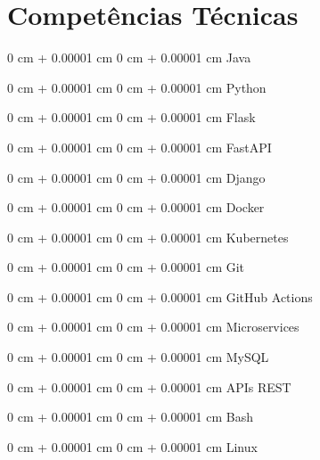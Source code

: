 \documentclass[10pt, letterpaper]{article}
\newenvironment{onecolentry}{
    \begin{adjustwidth}{
        0 cm + 0.00001 cm
    }{
        0 cm + 0.00001 cm
    }
}{
    \end{adjustwidth}
}
\begin{document}
\section{Competências Técnicas}
\begin{onecolentry}Java\end{onecolentry}
\vspace{0.2cm}
\begin{onecolentry}Python\end{onecolentry}
\vspace{0.2cm}
\begin{onecolentry}Flask\end{onecolentry}
\vspace{0.2cm}
\begin{onecolentry}FastAPI\end{onecolentry}
\vspace{0.2cm}
\begin{onecolentry}Django\end{onecolentry}
\vspace{0.2cm}
\begin{onecolentry}Docker\end{onecolentry}
\vspace{0.2cm}
\begin{onecolentry}Kubernetes\end{onecolentry}
\vspace{0.2cm}
\begin{onecolentry}Git\end{onecolentry}
\vspace{0.2cm}
\begin{onecolentry}GitHub Actions\end{onecolentry}
\vspace{0.2cm}
\begin{onecolentry}Microservices\end{onecolentry}
\vspace{0.2cm}
\begin{onecolentry}MySQL\end{onecolentry}
\vspace{0.2cm}
\begin{onecolentry}APIs REST\end{onecolentry}
\vspace{0.2cm}
\begin{onecolentry}Bash\end{onecolentry}
\vspace{0.2cm}
\begin{onecolentry}Linux\end{onecolentry}
\end{document}
